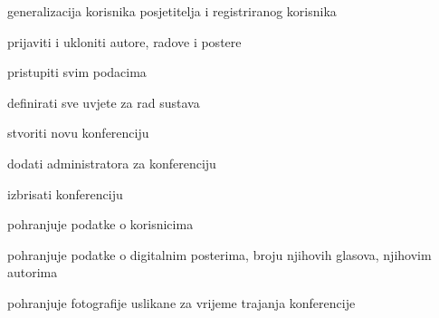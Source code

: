 \begin{packed_enum}
				\begin{packed_enum}
					
					\item generalizacija korisnika posjetitelja i registriranog korisnika
					
				\end{packed_enum}
				
				\item {}
				
				\begin{packed_enum}
					
					\item prijaviti i ukloniti autore, radove i postere
					\item pristupiti svim podacima
					\item definirati sve uvjete za rad sustava
					
				\end{packed_enum}
				
				\item {}
				
				\begin{packed_enum}
				
					\item stvoriti novu konferenciju
					\item dodati administratora za konferenciju
					\item izbrisati konferenciju
				
				\end{packed_enum}
				
				\item {}
				
				\begin{packed_enum}
					
					\item pohranjuje podatke o korisnicima
					\item pohranjuje podatke o digitalnim posterima, broju njihovih glasova, njihovim autorima
					\item pohranjuje fotografije uslikane za vrijeme trajanja konferencije
					
				\end{packed_enum}
				
				\item {}
				
				\begin{packed_enum}
					

\end{packed_enum}
\end{packed_enum}
